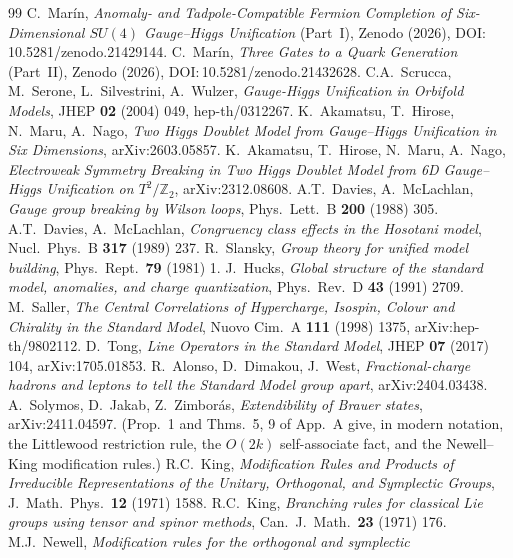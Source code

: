 \documentclass[11pt,a4paper]{article}
\newcommand{\ZZ}{\mathbb{Z}}
\begin{document}
\begin{thebibliography}{99}
 C.~Mar\'in, \emph{Anomaly- and Tadpole-Compatible Fermion Completion of
Six-Dimensional $SU(4)$ Gauge--Higgs Unification} (Part~I), Zenodo (2026),
DOI:\,10.5281/zenodo.21429144.
 C.~Mar\'in, \emph{Three Gates to a Quark Generation} (Part~II), Zenodo
(2026), DOI:\,10.5281/zenodo.21432628.
 C.A.~Scrucca, M.~Serone, L.~Silvestrini, A.~Wulzer, \emph{Gauge-Higgs
Unification in Orbifold Models}, JHEP \textbf{02} (2004) 049, hep-th/0312267.
 K.~Akamatsu, T.~Hirose, N.~Maru, A.~Nago, \emph{Two Higgs Doublet Model from
Gauge--Higgs Unification in Six Dimensions}, arXiv:2603.05857.
 K.~Akamatsu, T.~Hirose, N.~Maru, A.~Nago, \emph{Electroweak Symmetry Breaking
in Two Higgs Doublet Model from 6D Gauge--Higgs Unification on $T^2/\ZZ_2$},
arXiv:2312.08608.
 A.T.~Davies, A.~McLachlan, \emph{Gauge group breaking by Wilson
loops}, Phys.\ Lett.\ B \textbf{200} (1988) 305.
 A.T.~Davies, A.~McLachlan, \emph{Congruency class effects in the
Hosotani model}, Nucl.\ Phys.\ B \textbf{317} (1989) 237.
 R.~Slansky, \emph{Group theory for unified model building},
Phys.\ Rept.\ \textbf{79} (1981) 1.
 J.~Hucks, \emph{Global structure of the standard model, anomalies, and
charge quantization}, Phys.\ Rev.\ D \textbf{43} (1991) 2709.
 M.~Saller, \emph{The Central Correlations of Hypercharge, Isospin, Colour
and Chirality in the Standard Model}, Nuovo Cim.\ A \textbf{111} (1998) 1375,
arXiv:hep-th/9802112.
 D.~Tong, \emph{Line Operators in the Standard Model}, JHEP \textbf{07}
(2017) 104, arXiv:1705.01853.
 R.~Alonso, D.~Dimakou, J.~West, \emph{Fractional-charge hadrons and
leptons to tell the Standard Model group apart}, arXiv:2404.03438.
 A.~Solymos, D.~Jakab, Z.~Zimbor\'as, \emph{Extendibility of Brauer states},
arXiv:2411.04597. (Prop.~1 and Thms.~5, 9 of App.~A give, in modern notation, the Littlewood
restriction rule, the $O(2k)$ self-associate fact, and the Newell--King modification rules.)
 R.C.~King, \emph{Modification Rules and Products of Irreducible
Representations of the Unitary, Orthogonal, and Symplectic Groups}, J.\ Math.\ Phys.\
\textbf{12} (1971) 1588.
 R.C.~King, \emph{Branching rules for classical Lie groups using tensor and
spinor methods}, Can.\ J.\ Math.\ \textbf{23} (1971) 176.
 M.J.~Newell, \emph{Modification rules for the orthogonal and symplectic
}
\end{thebibliography}
\end{document}
